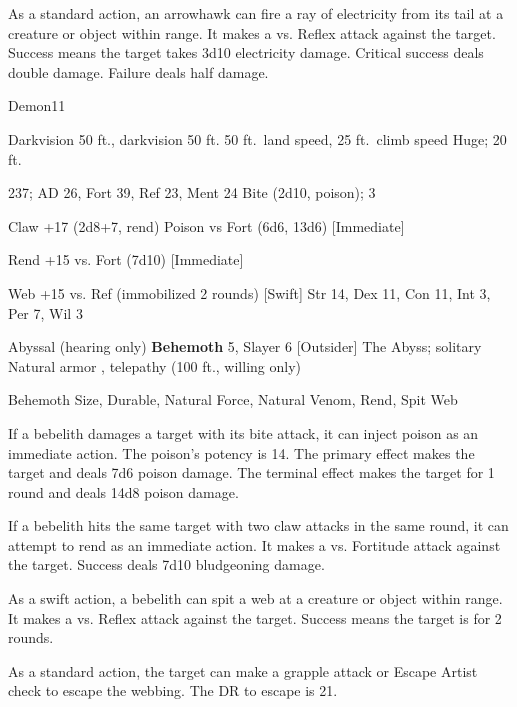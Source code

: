      As a standard action, an arrowhawk can fire a ray of electricity from its tail at a creature or object within \rngmed range.
    It makes a  vs. Reflex attack against the target.
    Success means the target takes 3d10 electricity damage.
    Critical success deals double damage.
    Failure deals half damage.

    \begin{monsection}[Bebelith]{Demon}{11}
        \begin{spellcontent}
            \begin{spelltargetinginfo}
                \pari {} Darkvision 50 ft., darkvision 50 ft.
                \pari {} 50 ft.\ land speed, 25 ft.\ climb speed
                \pari {} Huge;  20 ft.
            \end{spelltargetinginfo}
            \begin{spelleffects}
                \pari {} 237;  AD 26, Fort 39, Ref 23, Ment 24
                \pari {} Bite  (2d10, poison);  3
                \par Claw +17 (2d8+7, rend)
                \pari {} Poison  vs Fort (6d6, 13d6) [Immediate]
                \par Rend +15 vs. Fort (7d10) [Immediate]
                \par Web +15 vs. Ref (immobilized 2 rounds) [Swift]
                \pari {} Str 14, Dex 11, Con 11, Int 3, Per 7, Wil 3
            \end{spelleffects}
        \end{spellcontent}
        \begin{spellfooter}
            \pari {} Abyssal (hearing only)
            \pari {} \textbf{Behemoth} 5, Slayer 6 [Outsider]
            \pari {} The Abyss; solitary
            \pari {} Natural armor , telepathy (100 ft., willing only)
        \end{spellfooter}
    \end{monsection}
     Behemoth Size, Durable, Natural Force, Natural Venom, Rend, Spit Web

     If a bebelith damages a target with its bite attack, it can inject poison as an immediate action.
    The poison's potency is 14.
    The primary effect makes the target \sickened and deals 7d6 poison damage.
    The terminal effect makes the target \nauseated for 1 round and deals 14d8 poison damage.

     If a bebelith hits the same target with two claw attacks in the same round, it can attempt to rend as an immediate action.
    It makes a  vs. Fortitude attack against the target.
    Success deals 7d10 bludgeoning damage.

     As a swift action, a bebelith can spit a web at a creature or object within \rngmed range.
    It makes a  vs. Reflex attack against the target.
    Success means the target is \immobilized for 2 rounds.

    As a standard action, the target can make a grapple attack or Escape Artist check to escape the webbing.
    The DR to escape is 21.
